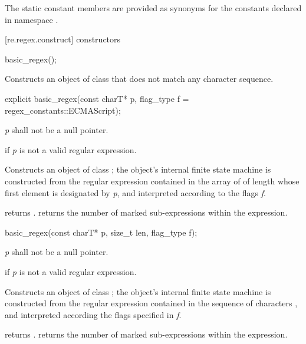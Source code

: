 \pnum
{}%
The static constant members are provided as synonyms for the constants
declared in namespace .

[re.regex.construct]{ constructors}
%

%
\begin{itemdecl}
basic_regex();
\end{itemdecl}

\begin{itemdescr}
\pnum
\effects  Constructs an object of class  that
does not match any character sequence.
\end{itemdescr}

%
\begin{itemdecl}
explicit basic_regex(const charT* p, flag_type f = regex_constants::ECMAScript);
\end{itemdecl}

\begin{itemdescr}
\pnum
\requires  \textit{p} shall not be a null pointer. 

\pnum
\throws  {} if \textit{p} is not a valid regular expression. 

\pnum
\effects  Constructs an object of class ; the object's
internal finite state machine is constructed from the regular
expression contained in the array of  of length
 whose first element is
designated by \textit{p}, and interpreted according to the flags \textit{f}.

\pnum\postconditions
{} returns .  
 returns the number of marked sub-expressions
within the expression.
\end{itemdescr}

%
\begin{itemdecl}
basic_regex(const charT* p, size_t len, flag_type f);
\end{itemdecl}

\begin{itemdescr}
\pnum
\requires  \textit{p} shall not be a null pointer.

\pnum
\throws  {} if \textit{p} is not a valid regular expression. 

\pnum
\effects  Constructs an object of class ; the object's
internal finite state machine is constructed from the regular
expression contained in the sequence of characters , and
interpreted according the flags specified in \textit{f}. 

\pnum\postconditions
{} returns .  
 returns the number of marked sub-expressions
within the expression.
\end{itemdescr}

